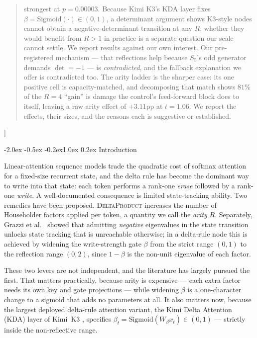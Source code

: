 \documentclass[10pt,twocolumn]{article}
\makeatletter
\renewcommand\section{\@startsection{section}{1}{\z@}%
  {-2.0ex \@plus -0.5ex \@minus -0.2ex}{1.0ex \@plus 0.2ex}%
  {\normalfont\large\bfseries}}
\makeatother
\begin{document}
\begin{@twocolumnfalse}
\begin{center}
\begin{minipage}{0.86\textwidth}
\begin{abstract}
strongest at $p=0.00003$. Because Kimi
K3's KDA layer fixes $\beta=\mathrm{Sigmoid}(\cdot)\in(0,1)$, a determinant
argument shows K3-style nodes cannot obtain a negative-determinant transition at
any $R$; whether they would benefit from $R>1$ in practice is a separate
question our scale cannot settle. We report results against our own interest.
Our pre-registered mechanism --- that reflections help because $S_5$'s odd
generator demands $\det=-1$ --- is \emph{contradicted}, and the fallback
explanation we offer is contradicted too. The arity ladder is the sharper case:
its one positive cell is capacity-matched, and decomposing that match shows
$81\%$ of the $R{=}4$ ``gain'' is damage the control's feed-forward block does to
itself, leaving a raw arity effect of $+3.11$pp at $t=1.06$. We report the
effects, their sizes, and the reasons each is suggestive or established.
\end{abstract}
\end{minipage}
\end{center}
\vspace{1.5ex}
\end{@twocolumnfalse}]
\makeatother

\section{Introduction}
\label{sec:intro}

Linear-attention sequence models trade the quadratic cost of softmax attention
for a fixed-size recurrent state, and the delta rule
\cite{schlag2021fwp,yang2024deltanet} has become the dominant way to write into
that state: each token performs a rank-one \emph{erase} followed by a rank-one
\emph{write}. A well-documented consequence is limited state-tracking ability.
Two remedies have been proposed. \textsc{DeltaProduct}
\cite{siems2025deltaproduct} increases the number of Householder factors applied
per token, a quantity we call the \emph{arity} $R$. Separately, Grazzi et al.\
\cite{grazzi2024negative} showed that admitting \emph{negative} eigenvalues in
the state transition unlocks state tracking that is unreachable otherwise; in a
delta-rule node this is achieved by widening the write-strength gate $\beta$
from the strict range $(0,1)$ to the reflection range $(0,2)$, since $1-\beta$
is the non-unit eigenvalue of each factor.

These two levers are not independent, and the literature has largely pursued the
first. That matters practically, because arity is expensive --- each extra factor
needs its own key and gate projections --- while widening $\beta$ is a
one-character change to a sigmoid that adds no parameters at all. It also
matters now, because the largest deployed delta-rule attention variant, the Kimi
Delta Attention (KDA) layer of Kimi~K3 \cite{kimi2026k3}, specifies
$\beta_t = \mathrm{Sigmoid}(W_\beta x_t) \in (0,1)$ --- strictly inside the
non-reflective range.
\end{document}
